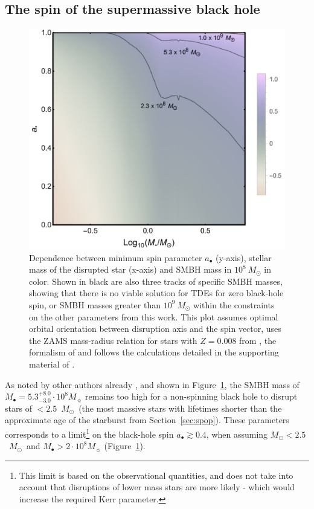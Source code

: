 \documentclass[traditabstract]{aa}
\newcommand{\Msun}{$M_\odot$}
\begin{document}
\subsection{The spin of the supermassive black hole}

\begin{figure}
  \includegraphics[width=0.999\linewidth]{fig/HillsContours.pdf}
\caption{Dependence between minimum spin parameter $a_\bullet$ (y-axis), stellar mass of the disrupted star (x-axis) and SMBH mass in $10^8~M_\odot$ in color. Shown in black are also three tracks of specific SMBH masses, showing that there is no viable solution for TDEs for zero black-hole spin, or SMBH masses greater than $10^9~M_\odot$ within the constraints on the other parameters from this work. This plot assumes optimal orbital orientation between disruption axis and the spin vector, uses the ZAMS mass-radius relation for stars with $Z=0.008$ from \citet{2000A&AS..141..371G}, the formalism of \citet{2012PhRvD..85b4037K} and follows the calculations detailed in the supporting material of \citet{2016NatAs...1E...2L}.}
\label{fig:Hills}
\end{figure}

As noted by other authors already \citep[e.g.][]{2015ATel.7776....1P, 2016Sci...351..257D, 2016NatAs...1E...2L}, and shown in Figure~\ref{fig:Hills}, the SMBH mass of $M_\bullet = 5.3_{-3.0}^{+8.0}\cdot10^{8} M_\sun$ remains too high for a non-spinning black hole to disrupt stars of $<2.5$~\Msun~(the most massive stars with lifetimes shorter than the approximate age of the starburst from Section~\ref{sec:spop}). These parameters corresponds to a limit\footnote{This limit is based on the observational quantities, and does not take into account that disruptions of lower mass stars are more likely - which would increase the required Kerr parameter.} on the black-hole spin $a_\bullet \gtrsim 0.4$, when assuming $M_\odot<2.5$~\Msun~and $M_\bullet > 2\cdot10^{8} M_\sun$ (Figure~\ref{fig:Hills}).
\end{document}
